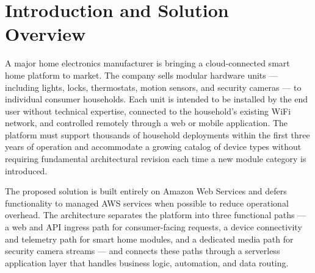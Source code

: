 \section{Introduction and Solution Overview}

A major home electronics manufacturer is bringing a cloud-connected smart home platform to market. The company sells modular hardware units — including lights, locks, thermostats, motion sensors, and security cameras — to individual consumer households. Each unit is intended to be installed by the end user without technical expertise, connected to the household's existing WiFi network, and controlled remotely through a web or mobile application. The platform must support thousands of household deployments within the first three years of operation and accommodate a growing catalog of device types without requiring fundamental architectural revision each time a new module category is introduced.

The proposed solution is built entirely on Amazon Web Services and defers functionality to managed AWS services when possible to reduce operational overhead. The architecture separates the platform into three functional paths — a web and API ingress path for consumer-facing requests, a device connectivity and telemetry path for smart home modules, and a dedicated media path for security camera streams — and connects these paths through a serverless application layer that handles business logic, automation, and data routing.
